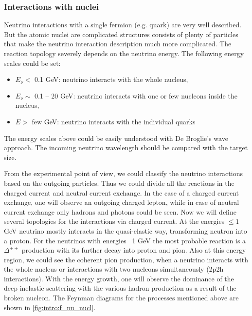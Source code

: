\documentclass[../main.tex]{subfiles}
\begin{document}
\subsubsection{Interactions with nuclei}
Neutrino interactions with a single fermion (e.g. quark) are very well described. But the atomic nuclei are complicated structures consists of plenty of particles that make the neutrino interaction description much more complicated. The reaction topology severely depends on the neutrino energy. The following energy scales could be set:
\begin{itemize}
  \item $E_\nu <$ 0.1 GeV: neutrino interacts with the whole nucleus,
  \item $E_\nu\sim$ 0.1 -- 20 GeV: neutrino interacts with one or few nucleons inside the nucleus,
  \item $E>$ few GeV: neutrino interacts with the individual quarks
\end{itemize}

The energy scales above could be easily understood with De Broglie's wave approach. The incoming neutrino wavelength should be compared with the target size.

From the experimental point of view, we could classify the neutrino interactions based on the outgoing particles. Thus we could divide all the reactions in the charged current and neutral current exchange. In the case of a charged current exchange, one will observe an outgoing charged lepton, while in case of neutral current exchange only hadrons and photons could be seen. Now we will define several topologies for the interactions via charged current. At the energies $\le1$ GeV neutrino mostly interacts in the quasi-elastic way, transforming neutron into a proton. For the neutrinos with energies ~1 GeV the most probable reaction is a $\Delta^{++}$ production with its further decay into proton and pion. Also at this energy region, we could see the coherent pion production, when a neutrino interacts with the whole nucleus or interactions with two nucleons simultaneously (2p2h interactions). With the energy growth, one will observe the dominance of the deep inelastic scattering with the various hadron production as a result of the broken nucleon. The Feynman diagrams for the processes mentioned above are shown in \autoref{fig:intro:f_nu_nucl}.
\end{document}
